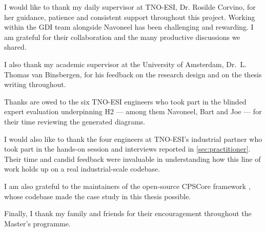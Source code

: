 I would like to thank my daily supervisor at TNO-ESI, Dr. Rosilde Corvino, for her
guidance, patience and consistent support throughout this project.
Working within the \ac{GDI} team alongside Navoneel has been
challenging and rewarding. I am grateful for their collaboration and the
many productive discussions we shared.

I also thank my academic supervisor at the University of Amsterdam,
Dr.\ L. Thomas van Binsbergen, for his feedback on the research design and
on the thesis writing throughout.

Thanks are owed to the six TNO-ESI engineers who took part in the blinded
expert evaluation underpinning H2 --- among them Navoneel, Bart and Joe ---
for their time reviewing the generated diagrams.

I would also like to thank the four engineers at TNO-ESI's industrial partner
who took part in the hands-on session and interviews reported in
\cref{sec:practitioner}.
Their time and candid feedback were invaluable in understanding how this
line of work holds up on a real industrial-scale codebase.

I am also grateful to the maintainers of the open-source CPSCore framework
\cite{theile:cpscore}, whose codebase made the case study in this thesis
possible.

Finally, I thank my family and friends for their encouragement throughout the
Master's programme.
